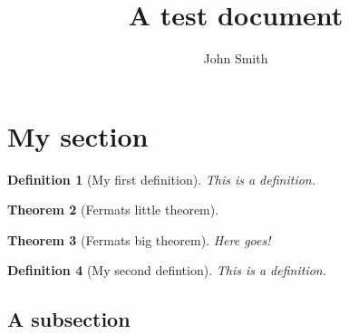 \documentclass[11pt, a4paper]{report} %
\title{A test document}
\author{John Smith}
\theoremstyle{plainspaced}
\newtheorem{theorem}{Theorem}[chapter]			%
\theoremstyle{plainspaced}
\newtheorem{definition}[theorem]{Definition}	%
\theoremstyle{definitionspaced}
\begin{document}
\maketitle

\begin{abstract}

\end{abstract}

\section{My section}

\begin{definition}[My first definition]
\label{def:my_first_definition}
	This is a definition.
\end{definition}

\begin{theorem}[Fermats little theorem]
	\label{thm:fermat}
\end{theorem}

\begin{theorem}[Fermats big theorem]
\label{thm:fermats_big_theorem}
	Here goes!
\end{theorem}

\begin{definition}[My second defintion]
\label{def:my_second_defintion}
	This is a definition.
\end{definition}

\subsection{A subsection}
\label{subsec:a_subsection}
\end{document}
